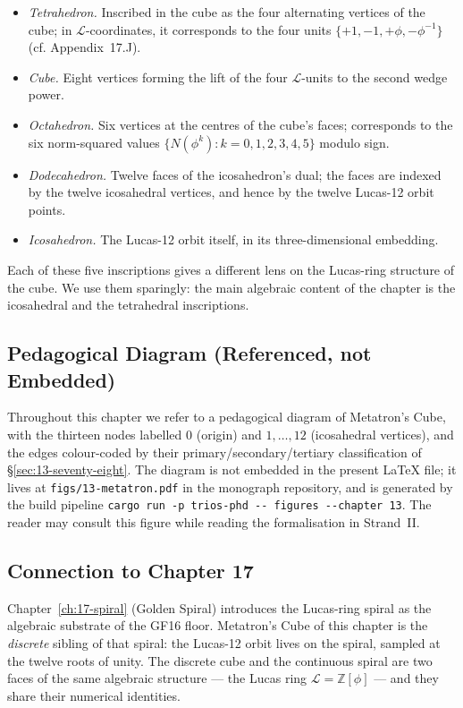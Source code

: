 \begin{itemize}
\item \emph{Tetrahedron.} Inscribed in the cube as the four
  alternating vertices of the cube; in $\mathcal{L}$-coordinates,
  it corresponds to the four units $\{+1, -1, +\phi, -\phi^{-1}\}$
  (cf. Appendix~17.J).
\item \emph{Cube.} Eight vertices forming the lift of the four
  $\mathcal{L}$-units to the second wedge power.
\item \emph{Octahedron.} Six vertices at the centres of the cube's
  faces; corresponds to the six norm-squared values
  $\{N(\phi^{k}) : k = 0, 1, 2, 3, 4, 5\}$ modulo sign.
\item \emph{Dodecahedron.} Twelve faces of the icosahedron's dual;
  the faces are indexed by the twelve icosahedral vertices, and
  hence by the twelve Lucas-12 orbit points.
\item \emph{Icosahedron.} The Lucas-12 orbit itself, in its
  three-dimensional embedding.
\end{itemize}

Each of these five inscriptions gives a different lens on the
Lucas-ring structure of the cube. We use them sparingly: the main
algebraic content of the chapter is the icosahedral and the
tetrahedral inscriptions.

\subsection{Pedagogical Diagram (Referenced, not Embedded)}
\label{fa_13:sec:13-diagram}

Throughout this chapter we refer to a pedagogical diagram of
Metatron's Cube, with the thirteen nodes labelled $0$ (origin) and
$1, \ldots, 12$ (icosahedral vertices), and the edges colour-coded
by their primary/secondary/tertiary classification of
\S\ref{sec:13-seventy-eight}. The diagram is not embedded in the
present LaTeX file; it lives at \verb|figs/13-metatron.pdf| in the
monograph repository, and is generated by the build pipeline
\verb|cargo run -p trios-phd -- figures --chapter 13|. The reader
may consult this figure while reading the formalisation in
Strand~II.

\subsection{Connection to Chapter 17}
\label{fa_13:sec:13-connection-to-17}

Chapter~\ref{ch:17-spiral} (Golden Spiral) introduces the Lucas-ring
spiral as the algebraic substrate of the GF16 floor. Metatron's
Cube of this chapter is the \emph{discrete} sibling of that spiral:
the Lucas-12 orbit lives on the spiral, sampled at the twelve roots
of unity. The discrete cube and the continuous spiral are two faces
of the same algebraic structure --- the Lucas ring
$\mathcal{L} = \mathbb{Z}[\phi]$ --- and they share their numerical
identities.

